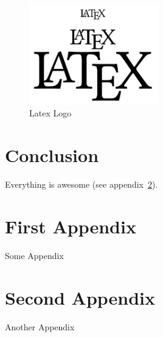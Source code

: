 \documentclass[12pt,a4paper]{article} %
\begin{document}
\begin{figure}[!ht]
	\centering
	\includegraphics[width=0.5\textwidth]{latex.png}
	\caption{Latex Logo}
	\label{fig:latex-logo}
\end{figure}

\newpage
\section{Conclusion}\label{sec:conclusion}
Everything is awesome (see appendix~\ref{sec:first-appendix}).


\newpage
\printbibliography
{}


\newpage
\begin{appendices}
\makeatletter
{}
\makeatother

\section{First Appendix}\label{sec:first-appendix}
Some Appendix

\newpage
\section{Second Appendix}\label{sec:second-appendix}
Another Appendix

\end{appendices}

\end{document}
